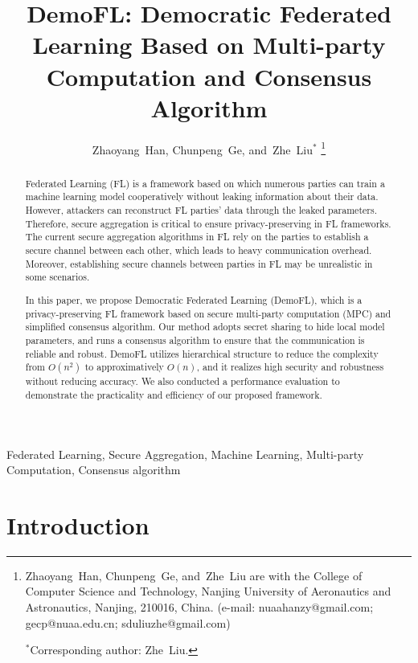 \documentclass[journal]{IEEEtran}
\begin{document}
\title {DemoFL: Democratic Federated Learning Based on Multi-party Computation and Consensus Algorithm}

\author{Zhaoyang~Han,
        Chunpeng~Ge,
        and~Zhe~Liu$^*$%
\thanks{Zhaoyang~Han, Chunpeng~Ge, and~Zhe~Liu are with the College of Computer Science and Technology, Nanjing University of Aeronautics and Astronautics, Nanjing, 210016, China. (e-mail: nuaahanzy@gmail.com; gecp@nuaa.edu.cn; sduliuzhe@gmail.com) 

$^*$Corresponding author: Zhe~Liu.}
}

\maketitle

\begin{abstract}
Federated Learning (FL) is a framework based on which numerous parties can train a machine learning model cooperatively without leaking information about their data. However, attackers can reconstruct FL parties' data through the leaked parameters. Therefore, secure aggregation is critical to ensure privacy-preserving in FL frameworks. The current secure aggregation algorithms in FL rely on the parties to establish a secure channel between each other, which leads to heavy communication overhead. Moreover, establishing secure channels between parties in FL may be unrealistic in some scenarios.

In this paper, we propose Democratic Federated Learning (DemoFL), which is a privacy-preserving FL framework based on secure multi-party computation (MPC) and simplified consensus algorithm. Our method adopts secret sharing to hide local model parameters, and runs a consensus algorithm to ensure that the communication is reliable and robust. DemoFL utilizes hierarchical structure to reduce the complexity from $O(n^2)$ to approximatively $O(n)$, and it realizes high security and robustness without reducing accuracy. We also conducted a performance evaluation to demonstrate the practicality and efficiency of our proposed framework. 

\end{abstract}

\begin{IEEEkeywords}
    Federated Learning, Secure Aggregation, Machine Learning, Multi-party Computation, Consensus algorithm
\end{IEEEkeywords}


\section{Introduction} 
\label{sec:intro}

\end{document}
